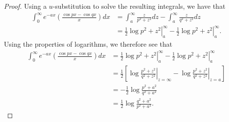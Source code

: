 \begin{proof}
  Using a $u$-substitution to solve the resulting integrals, we have that
  \begin{align*}
    \int_0^\infty e^{-ax} \left(\frac{\cos p x - \cos q x}{x}\right) dx
    &= \int_a^\infty \frac{z}{p^2 + z^2} dz - \int_a^\infty \frac{z}{q^2 + z^2} dz\\
    &= \left.\frac{1}{2}\log p^2 + z^2 \right\rvert_{a}^\infty - \left.\frac{1}{2}\log p^2 + z^2 \right\rvert_{a}^\infty .
  \end{align*}
  Using the properties of logarithms, we therefore see that
  \begin{align*}
    \int_0^\infty e^{-ax} \left(\frac{\cos p x - \cos q x}{x}\right) dx
    &= \left.\frac{1}{2}\log p^2 + z^2 \right\rvert_{a}^\infty - \left.\frac{1}{2}\log p^2 + z^2 \right\rvert_{a}^\infty  \\
    &= \frac{1}{2} \left[\left.\log \frac{p^2 + z^2}{q^2 + z^2}\right\rvert_{z=\infty} - \left.\log \frac{p^2 + z^2}{q^2 + z^2}\right\rvert_{z=a} \right] \\
    &= -\frac{1}{2} \log \frac{p^2 + a^2}{q^2 + a^2} \\
    &= \frac{1}{2} \log \frac{q^2 + a^2}{p^2 + a^2}.
  \end{align*}

\end{proof}
\newpage
